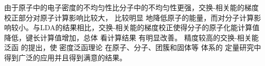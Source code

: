 {%
%
%
%

由于原子中的电子密度的不均匀性比分子中的不均匀性更强，交换-相关能的梯度校正部分对原子{计算}影响比较大，%
比较明显%
{地}降低原子的能量，而对分子{计算}影响较小{。}与LDA的结果相比，交换-相关能的梯度校正使得分子的原子化能{计算值}降低，键长{计算值}增加，总体%
{看计算}结果%
有明显改善。%
精度较高的交换-相关能泛函%
的提出，使%
密度泛函理论%
{在}原子、分子、团簇和固体等%
体系的%
{定量研究中得到广泛的应用并且得到满意的结果。}

}
